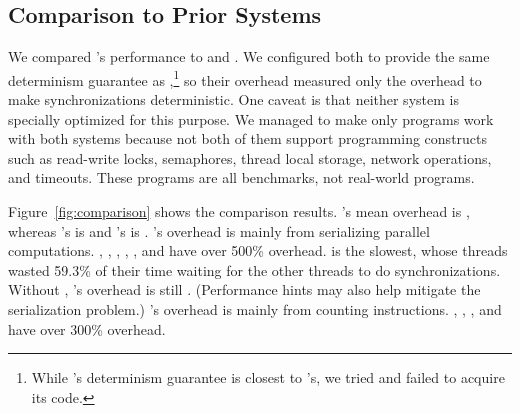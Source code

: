 
\subsection{Comparison to Prior Systems} \label{sec:comparison}

We compared \xxx's performance to \dthreads and \coredet.  We configured
both to provide the same determinism guarantee as \xxx,\footnote{While
  \kendo's determinism guarantee is closest to \xxx's, we tried and failed
  to acquire its code.}  so their overhead measured only the overhead to
make synchronizations deterministic.  One caveat is that neither system is
specially optimized for this purpose.  We managed to make only
\nprogcompared programs work with both systems because not both of them
support programming constructs such as read-write locks, semaphores,
thread local storage, network operations, and timeouts. These programs are
all benchmarks, not real-world programs.

Figure~\ref{fig:comparison} shows the comparison results.
\xxx's mean overhead is \xxxcompoverhead,
whereas \dthreads's is \dthreadssyncoverhead and \coredet's is
\coredetoverhead. 
\dthreads's overhead is mainly from serializing
parallel computations. \dedup, \ferret, \fluidanimate, 
\barnes, \radiosity, and \raytrace have over 500\%
overhead.  \fluidanimate is the slowest, whose threads wasted 59.3\% of their time
waiting for the other threads to do synchronizations.
Without \fluidanimate, \dthreads's overhead is still
\dthreadssyncoverheadnoflui.  (Performance hints may also help
\dthreads mitigate the serialization problem.)  \coredet's overhead is
mainly from counting instructions. \ferret, \fluidanimate, \barnes, and
\raytrace have over 300\% overhead.

